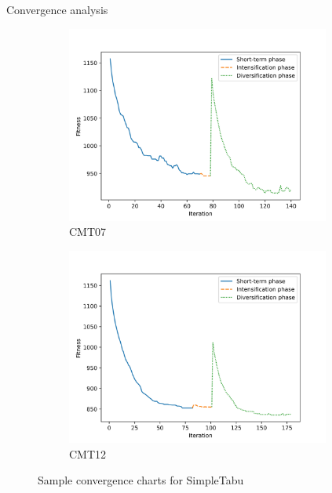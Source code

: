 \documentclass[9pt]{beamer}
\begin{document}
\begin{frame}{Convergence analysis}
\begin{figure}[ht]
    \centering
    \begin{subfigure}[b]{0.48\linewidth}
        \centering
        \includegraphics[width=0.95\textwidth]{images/converge_1.jpg}
        \caption{CMT07}
    \end{subfigure}
    \begin{subfigure}[b]{0.48\linewidth}
        \centering
        \includegraphics[width=0.95\textwidth]{images/converge_2.jpg}
        \caption{CMT12}
    \end{subfigure}
    \caption{Sample convergence charts for SimpleTabu}
\end{figure}
\end{frame}
\end{document}
